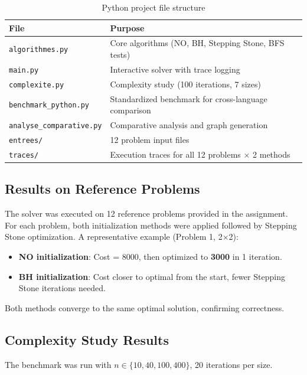 \documentclass[12pt,a4paper]{article}
\begin{document}
\begin{table}[H]
\centering
\begin{tabular}{ll}
\toprule
\textbf{File} & \textbf{Purpose} \\
\midrule
\texttt{algorithmes.py} & Core algorithms (NO, BH, Stepping Stone, BFS tests) \\
\texttt{main.py} & Interactive solver with trace logging \\
\texttt{complexite.py} & Complexity study (100 iterations, 7 sizes) \\
\texttt{benchmark\_python.py} & Standardized benchmark for cross-language comparison \\
\texttt{analyse\_comparative.py} & Comparative analysis and graph generation \\
\texttt{entrees/} & 12 problem input files \\
\texttt{traces/} & Execution traces for all 12 problems $\times$ 2 methods \\
\bottomrule
\end{tabular}
\caption{Python project file structure}
\end{table}

\subsection{Results on Reference Problems}

The solver was executed on 12 reference problems provided in the assignment. For each problem, both initialization methods were applied followed by Stepping Stone optimization. A representative example (Problem 1, 2$\times$2):

\begin{itemize}
  \item \textbf{NO initialization}: Cost = 8000, then optimized to \textbf{3000} in 1 iteration.
  \item \textbf{BH initialization}: Cost closer to optimal from the start, fewer Stepping Stone iterations needed.
\end{itemize}

Both methods converge to the same optimal solution, confirming correctness.

\subsection{Complexity Study Results}

The benchmark was run with $n \in \{10, 40, 100, 400\}$, 20 iterations per size.
\end{document}
